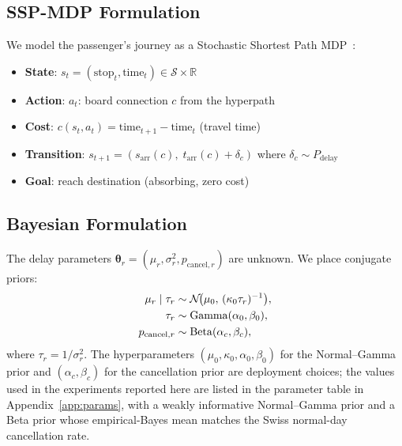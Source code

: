 \documentclass[opre,dblanonrev]{informs4}
\begin{document}
\subsection{SSP-MDP Formulation}

We model the passenger's journey as a Stochastic Shortest Path MDP~\citep{bertsekas1991}:
\begin{itemize}
    \item \textbf{State}: $s_t = (\text{stop}_t, \text{time}_t) \in \mathcal{S} \times \mathbb{R}$
    \item \textbf{Action}: $a_t$: board connection $c$ from the hyperpath
    \item \textbf{Cost}: $c(s_t, a_t) = \text{time}_{t+1} - \text{time}_t$ (travel time)
    \item \textbf{Transition}: $s_{t+1} = (s_{\mathrm{arr}}(c),\; t_{\mathrm{arr}}(c) + \delta_c)$ where $\delta_c \sim P_{\mathrm{delay}}$
    \item \textbf{Goal}: reach destination (absorbing, zero cost)
\end{itemize}

\subsection{Bayesian Formulation}

The delay parameters $\bm{\theta}_r = (\mu_r, \sigma_r^2, p_{\mathrm{cancel},r})$
are unknown.
We place conjugate priors:
\begin{align}
    \mu_r \mid \tau_r &\sim \mathcal{N}\!\bigl(\mu_0,\,(\kappa_0 \tau_r)^{-1}\bigr), \label{eq:prior}\\
    \tau_r &\sim \mathrm{Gamma}(\alpha_0, \beta_0), \notag\\
    p_{\mathrm{cancel},r} &\sim \mathrm{Beta}(\alpha_c, \beta_c), \label{eq:prior_cancel}
\end{align}
where $\tau_r = 1/\sigma_r^2$. The hyperparameters
$(\mu_0,\kappa_0,\alpha_0,\beta_0)$ for the Normal--Gamma prior and
$(\alpha_c,\beta_c)$ for the cancellation prior are deployment
choices; the values used in the experiments reported here are
listed in the parameter table in Appendix~\ref{app:params}, with a
weakly informative Normal--Gamma prior and a Beta prior whose
empirical-Bayes mean matches the Swiss normal-day cancellation
rate.
\end{document}
